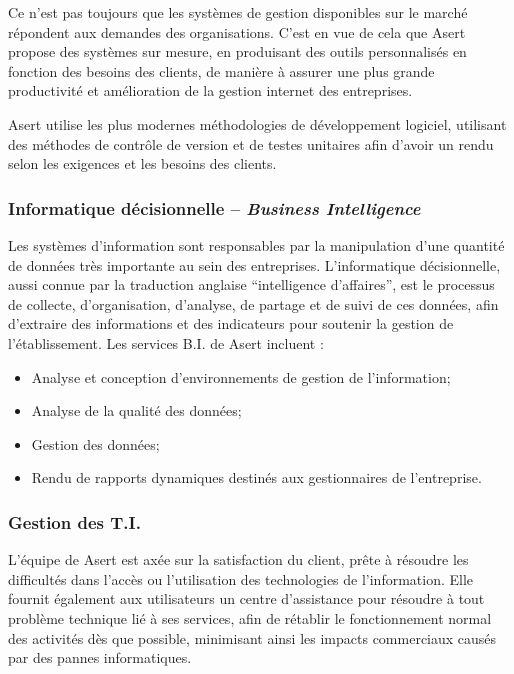 Ce n'est pas toujours que les systèmes de gestion disponibles sur le marché répondent aux demandes des organisations. C'est en vue de cela que Asert propose des systèmes sur mesure, en produisant des outils personnalisés en fonction des besoins des clients, de manière à assurer une plus grande productivité et amélioration de la gestion internet des entreprises.

Asert utilise les plus modernes méthodologies de développement logiciel, utilisant des méthodes de contrôle de version et de testes unitaires afin d'avoir un rendu selon les exigences et les besoins des clients.

\subsubsection{Informatique décisionnelle -- \textit{Business Intelligence}}

Les systèmes d'information sont responsables par la manipulation d'une quantité de données très importante au sein des entreprises. L'informatique décisionnelle, aussi connue par la traduction anglaise ``intelligence d'affaires'', est le processus de collecte, d'organisation, d'analyse, de partage et de suivi de ces données, afin d'extraire des informations et des indicateurs pour soutenir la gestion de l'établissement. Les services B.I. de Asert incluent :

\begin{itemize}
\item Analyse et conception d'environnements de gestion de l'information;
\item Analyse de la qualité des données;
\item Gestion des données;
\item Rendu de rapports dynamiques destinés aux gestionnaires de l'entreprise.
\end{itemize}

\subsubsection{Gestion des T.I.}

L'équipe de Asert est axée sur la satisfaction du client, prête à résoudre les difficultés dans l'accès ou l'utilisation des technologies de l'information. Elle fournit également aux utilisateurs un centre d'assistance pour résoudre à tout problème technique lié à ses services, afin de rétablir le fonctionnement normal des activités dès que possible, minimisant ainsi les impacts commerciaux causés par des pannes informatiques.

